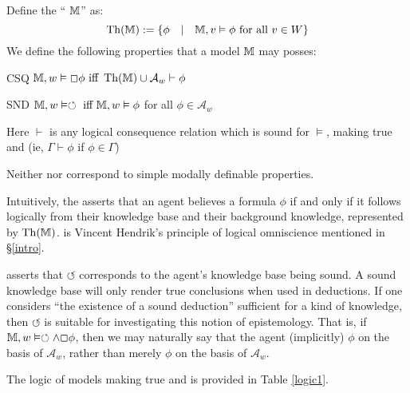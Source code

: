 \begin{definition}
  Define the `` $\mathbbm{M}$'' as:
  \[ \tmop{Th} (\mathbbm{M}) \assign \{\phi \hspace{1em} | \hspace{1em}
     \mathbbm{M}, v \vDash \phi \text{ for all } v \in W\} \]
  We define the following properties that a model $\mathbbm{M}$ may posses:
  
  \begin{descriptiondash}
    \item[CSQ] $\mathbbm{M}, w \vDash \Box \phi \text{ iff } \tmop{Th}
    (\mathbbm{M}) \cup \mathcal{A}_w \vdash \phi$
    
    \item[SND] $\mathbbm{M}, w \vDash \circlearrowleft \text{ iff }
    \mathbbm{M}, w \vDash \phi$ for all $\phi \in \mathcal{A}_w$
  \end{descriptiondash}
  
  Here $\vdash$ is any logical consequence relation which is sound for
  $\vDash$, making true  and  (ie,
  $\Gamma \vdash \phi$ if $\phi \in \Gamma$)
\end{definition}

Neither  nor  correspond to simple modally
definable properties.



Intuitively, the  asserts that an agent believes a formula
$\phi$ if and only if it follows logically from their knowledge base and their
background knowledge, represented by $\tmop{Th} (\mathbbm{M})$. 
 is Vincent Hendrik's principle of logical omniscience mentioned
in {\S}\ref{intro}.



 asserts that $\circlearrowleft$ corresponds to the agent's
knowledge base being sound. A sound knowledge base will only render true
conclusions when used in deductions.  If one considers ``the existence of a
sound deduction'' sufficient for a kind of knowledge, then $\circlearrowleft$
is suitable for investigating this notion of epistemology.  That is, if
$\mathbbm{M}, w \vDash \circlearrowleft \wedge \Box \phi$, then we may
naturally say that the agent (implicitly) {} $\phi$ on the basis
of $\mathcal{A}_w$, rather than merely {} $\phi$ on the basis
of $\mathcal{A}_w$.



The logic of models making true  and  is provided
in Table \ref{logic1}.

